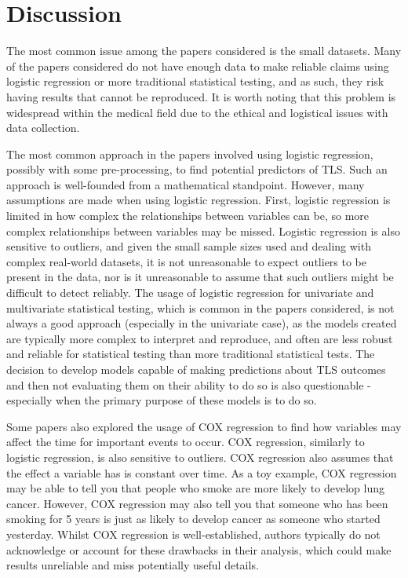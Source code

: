 \documentclass{article}
\begin{document}
\section{Discussion}

The most common issue among the papers considered is the small datasets. Many of the papers considered do not have enough data to make reliable claims using logistic regression or more traditional statistical testing, and as such, they risk having results that cannot be reproduced. It is worth noting that this problem is widespread within the medical field due to the ethical and logistical issues with data collection.

The most common approach in the papers involved using logistic regression, possibly with some pre-processing, to find potential predictors of TLS. Such an approach is well-founded from a mathematical standpoint. However, many assumptions are made when using logistic regression. First, logistic regression is limited in how complex the relationships between variables can be, so more complex relationships between variables may be missed. Logistic regression is also sensitive to outliers, and given the small sample sizes used and dealing with complex real-world datasets, it is not unreasonable to expect outliers to be present in the data, nor is it unreasonable to assume that such outliers might be difficult to detect reliably. The usage of logistic regression for univariate and multivariate statistical testing, which is common in the papers considered, is not always a good approach (especially in the univariate case), as the models created are typically more complex to interpret and reproduce, and often are less robust and reliable for statistical testing than more traditional statistical tests. The decision to develop models capable of making predictions about TLS outcomes and then not evaluating them on their ability to do so is also questionable - especially when the primary purpose of these models is to do so.

Some papers also explored the usage of COX regression to find how variables may affect the time for important events to occur. COX regression, similarly to logistic regression, is also sensitive to outliers. COX regression also assumes that the effect a variable has is constant over time. As a toy example, COX regression may be able to tell you that people who smoke are more likely to develop lung cancer. However, COX regression may also tell you that someone who has been smoking for 5 years is just as likely to develop cancer as someone who started yesterday. Whilst COX regression is well-established, authors typically do not acknowledge or account for these drawbacks in their analysis, which could make results unreliable and miss potentially useful details.
\end{document}
